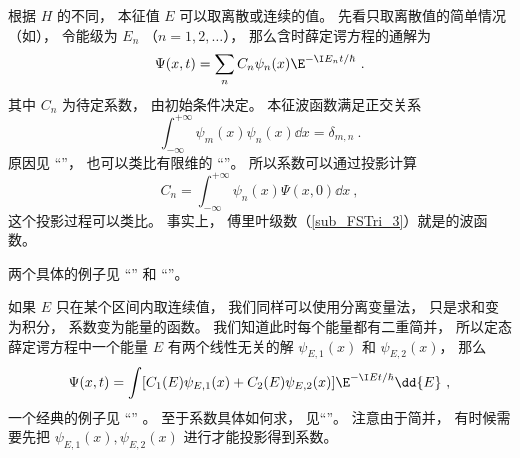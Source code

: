 根据 $H$ 的不同， 本征值 $E$ 可以取离散或连续的值。 先看只取离散值的简单情况（如）， 令能级为 $E_n$ （$n = 1, 2, \dots$）， 那么含时薛定谔方程的通解为
\begin{equation}\label{eq_TDSE11_5}
\Psi(x, t) = \sum_n C_n \psi_n(x) \E^{-\I E_n t/\hbar}~.
\end{equation}
其中 $C_n$ 为待定系数， 由初始条件决定。 本征波函数满足正交关系
\begin{equation}
\int_{-\infty}^{+\infty}\psi_m(x)\psi_n(x)\dd{x} = \delta_{m,n}~.
\end{equation}
原因见 “”， 也可以类比有限维的 “”。 所以系数可以通过投影计算
\begin{equation}
C_n = \int_{-\infty}^{+\infty} \psi_n(x)\Psi(x, 0) \dd{x}~,
\end{equation}
这个投影过程可以类比。 事实上， 傅里叶级数（\autoref{sub_FSTri_3}）就是的波函数。

两个具体的例子见 “” 和 “”。

如果 $E$ 只在某个区间内取连续值， 我们同样可以使用分离变量法， 只是求和变为积分， 系数变为能量的函数。 我们知道此时每个能量都有二重简并， 所以定态薛定谔方程中一个能量 $E$ 有两个线性无关的解 $\psi_{E,1}(x)$ 和 $\psi_{E,2}(x)$， 那么
\begin{equation}\label{eq_TDSE11_4}
\Psi(x, t) = \int [C_1(E) \psi_{E,1}(x) + C_2(E) \psi_{E,2}(x)] \E^{-\I E t/\hbar} \dd{E}~,
\end{equation}
一个经典的例子见 “” 。 至于系数具体如何求， 见“”。 注意由于简并， 有时候需要先把 $\psi_{E,1}(x), \psi_{E,2}(x)$ 进行才能投影得到系数。
